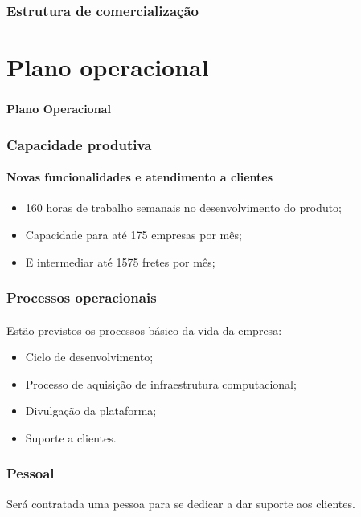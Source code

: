 \documentclass{beamer}
\begin{document}
\begin{frame}
  \frametitle{Estrutura de comercialização}
  \framesubtitle{}

\end{frame}

\section{Plano operacional}
\begin{frame}
  \frametitle{}
  \framesubtitle{}

  \begin{center}
    {\huge\textbf{Plano Operacional}}
  \end{center}
\end{frame}

\begin{frame}
  \frametitle{Capacidade produtiva}
  \framesubtitle{Novas funcionalidades e atendimento a clientes}
  
  \begin{itemize}
    \item 160 horas de trabalho semanais no desenvolvimento do produto;
    \item Capacidade para até 175 empresas por mês;
    \item E intermediar até 1575 fretes por mês;
  \end{itemize}
    
\end{frame}

\begin{frame}
  \frametitle{Processos operacionais}
  \framesubtitle{}
  
  Estão previstos os processos básico da vida da empresa:  
  \begin{itemize}
    \item Ciclo de desenvolvimento;
    \item Processo de aquisição de infraestrutura computacional;
    \item Divulgação da plataforma;
    \item Suporte a clientes.
  \end{itemize}

\end{frame}

\begin{frame}
  \frametitle{Pessoal}
  
  Será contratada uma pessoa para se dedicar a dar suporte aos clientes.

\end{frame}
\end{document}
